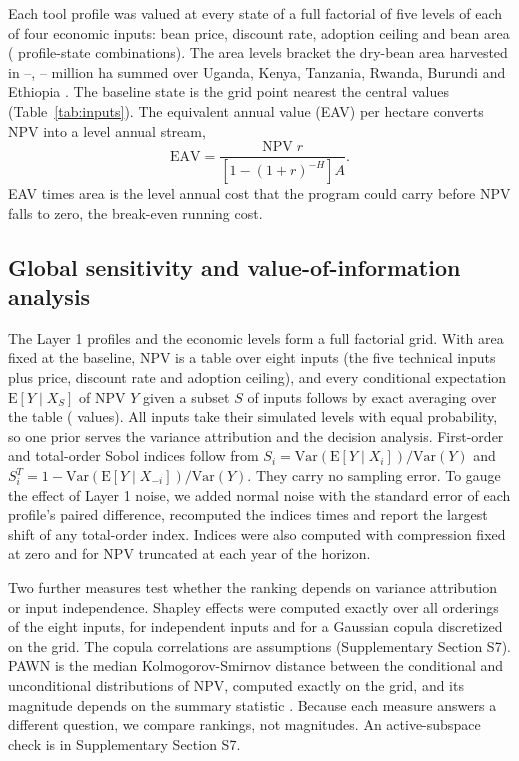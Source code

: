 Each tool profile was valued at every state of a full factorial of five levels of each of four economic inputs: bean price, discount rate, adoption ceiling and bean area (\NumNlookupRows{} profile-state combinations). The area levels bracket the dry-bean area harvested in \NumFaoYearFrom--\NumFaoYearTo, \NumFaoSixMin--\NumFaoSixMax{} million ha summed over Uganda, Kenya, Tanzania, Rwanda, Burundi and Ethiopia \citep{FAO2025FAOSTATQCL}. The baseline state is the grid point nearest the central values (Table~\ref{tab:inputs}). The equivalent annual value (EAV) per hectare converts NPV into a level annual stream,
\begin{equation}
\mathrm{EAV} = \frac{\mathrm{NPV}\; r}{\left[1-(1+r)^{-H}\right] A}.
\label{eq:eav}
\end{equation}
EAV times area is the level annual cost that the program could carry before NPV falls to zero, the break-even running cost.

\subsection{Global sensitivity and value-of-information analysis}
\label{sec:gsa}

The Layer 1 profiles and the economic levels form a full factorial grid. With area fixed at the baseline, NPV is a table over eight inputs (the five technical inputs plus price, discount rate and adoption ceiling), and every conditional expectation $\mathrm{E}[Y \mid X_S]$ of NPV $Y$ given a subset $S$ of inputs follows by exact averaging over the table (\NumNexactGrid{} values). All inputs take their simulated levels with equal probability, so one prior serves the variance attribution and the decision analysis. First-order and total-order Sobol indices \citep{Sobol2001Global} follow from $S_i = \mathrm{Var}(\mathrm{E}[Y \mid X_i])/\mathrm{Var}(Y)$ and $S^T_i = 1 - \mathrm{Var}(\mathrm{E}[Y \mid X_{-i}])/\mathrm{Var}(Y)$. They carry no sampling error. To gauge the effect of Layer 1 noise, we added normal noise with the standard error of each profile's paired difference, recomputed the indices \NumBootB{} times and report the largest shift of any total-order index. Indices were also computed with compression fixed at zero and for NPV truncated at each year of the horizon.

Two further measures test whether the ranking depends on variance attribution or input independence. Shapley effects \citep{Owen2017Shapley,Song2016Shapley,Iooss2019Shapley} were computed exactly over all orderings of the eight inputs, for independent inputs and for a Gaussian copula discretized on the grid. The copula correlations are assumptions (Supplementary Section S7). PAWN \citep{Pianosi2015Simple} is the median Kolmogorov-Smirnov distance between the conditional and unconditional distributions of NPV, computed exactly on the grid, and its magnitude depends on the summary statistic \citep{Puy2020Sensitivity}. Because each measure answers a different question, we compare rankings, not magnitudes. An active-subspace check is in Supplementary Section S7.

